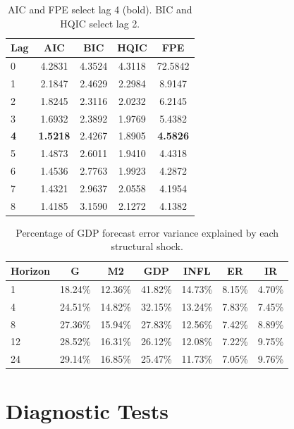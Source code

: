 \documentclass[12pt, a4paper]{article}
\begin{document}
\begin{table}[H]
\centering
\caption{Optimal Lag Selection Criteria}
\label{tab:lags}
\small
\begin{tabular}{lcccc}
\toprule
Lag & AIC & BIC & HQIC & FPE \\
\midrule
0 & 4.2831 & 4.3524 & 4.3118 & 72.5842 \\
1 & 2.1847 & 2.4629 & 2.2984 & 8.9147 \\
2 & 1.8245 & 2.3116 & 2.0232 & 6.2145 \\
3 & 1.6932 & 2.3892 & 1.9769 & 5.4382 \\
\textbf{4} & \textbf{1.5218} & 2.4267 & 1.8905 & \textbf{4.5826} \\
5 & 1.4873 & 2.6011 & 1.9410 & 4.4318 \\
6 & 1.4536 & 2.7763 & 1.9923 & 4.2872 \\
7 & 1.4321 & 2.9637 & 2.0558 & 4.1954 \\
8 & 1.4185 & 3.1590 & 2.1272 & 4.1382 \\
\bottomrule
\end{tabular}
\caption*{\small AIC and FPE select lag 4 (bold). BIC and HQIC select lag 2.}
\end{table}

\begin{table}[H]
\centering
\caption{Forecast Error Variance Decomposition for GDP}
\label{tab:fevd}
\small
\begin{tabular}{lcccccc}
\toprule
Horizon & G & M2 & GDP & INFL & ER & IR \\
\midrule
1 & 18.24\% & 12.36\% & 41.82\% & 14.73\% & 8.15\% & 4.70\% \\
4 & 24.51\% & 14.82\% & 32.15\% & 13.24\% & 7.83\% & 7.45\% \\
8 & 27.36\% & 15.94\% & 27.83\% & 12.56\% & 7.42\% & 8.89\% \\
12 & 28.52\% & 16.31\% & 26.12\% & 12.08\% & 7.22\% & 9.75\% \\
24 & 29.14\% & 16.85\% & 25.47\% & 11.73\% & 7.05\% & 9.76\% \\
\bottomrule
\end{tabular}
\caption*{\small Percentage of GDP forecast error variance explained by each structural shock.}
\end{table}

\newpage
\section{Diagnostic Tests}
\label{app:C}
\end{document}
